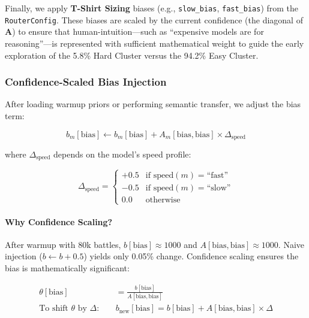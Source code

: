 \documentclass[sigconf]{acmart}
\begin{document}
Finally, we apply \textbf{T-Shirt Sizing} biases (e.g., \texttt{slow\_bias}, \texttt{fast\_bias}) from the \texttt{RouterConfig}. These biases are scaled by the current confidence (the diagonal of $\mathbf{A}$) to ensure that human-intuition---such as ``expensive models are for reasoning''---is represented with sufficient mathematical weight to guide the early exploration of the 5.8\% Hard Cluster versus the 94.2\% Easy Cluster.

\subsubsection{Confidence-Scaled Bias Injection}

After loading warmup priors or performing semantic transfer, we adjust the bias term:

\begin{equation}
b_m[\text{bias}] \leftarrow b_m[\text{bias}] + A_m[\text{bias}, \text{bias}] \times \Delta_{\text{speed}}
\label{eq:bias_injection}
\end{equation}

where $\Delta_{\text{speed}}$ depends on the model's speed profile:

\begin{equation}
\Delta_{\text{speed}} = \begin{cases}
+0.5 & \text{if } \text{speed}(m) = \text{``fast''} \\
-0.5 & \text{if } \text{speed}(m) = \text{``slow''} \\
0.0 & \text{otherwise}
\end{cases}
\label{eq:speed_bias}
\end{equation}

\paragraph{Why Confidence Scaling?}
After warmup with 80k battles, $b[\text{bias}] \approx 1000$ and $A[\text{bias}, \text{bias}] \approx 1000$. Naive injection ($b \leftarrow b + 0.5$) yields only 0.05\% change. Confidence scaling ensures the bias is mathematically significant:

\begin{align}
\theta[\text{bias}] &= \frac{b[\text{bias}]}{A[\text{bias}, \text{bias}]} \\
\text{To shift } \theta \text{ by } \Delta: \quad &b_{\text{new}}[\text{bias}] = b[\text{bias}] + A[\text{bias}, \text{bias}] \times \Delta
\end{align}
\end{document}
